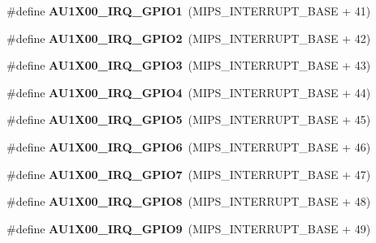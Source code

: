 \begin{DoxyCompactItemize}
\#define {\bfseries A\+U1\+X00\+\_\+\+I\+R\+Q\+\_\+\+G\+P\+I\+O1}~(M\+I\+P\+S\+\_\+\+I\+N\+T\+E\+R\+R\+U\+P\+T\+\_\+\+B\+A\+SE + 41)
\item 
\mbox{\label{group__bsp__interrupt_ga1203c8c40b46cea1be0cb1e045e48c7f}} 
\#define {\bfseries A\+U1\+X00\+\_\+\+I\+R\+Q\+\_\+\+G\+P\+I\+O2}~(M\+I\+P\+S\+\_\+\+I\+N\+T\+E\+R\+R\+U\+P\+T\+\_\+\+B\+A\+SE + 42)
\item 
\mbox{\label{group__bsp__interrupt_ga5fca3239b864790ea4bc6f1bbf966eea}} 
\#define {\bfseries A\+U1\+X00\+\_\+\+I\+R\+Q\+\_\+\+G\+P\+I\+O3}~(M\+I\+P\+S\+\_\+\+I\+N\+T\+E\+R\+R\+U\+P\+T\+\_\+\+B\+A\+SE + 43)
\item 
\mbox{\label{group__bsp__interrupt_gaf63059f170193b318ec094d32a73c7f2}} 
\#define {\bfseries A\+U1\+X00\+\_\+\+I\+R\+Q\+\_\+\+G\+P\+I\+O4}~(M\+I\+P\+S\+\_\+\+I\+N\+T\+E\+R\+R\+U\+P\+T\+\_\+\+B\+A\+SE + 44)
\item 
\mbox{\label{group__bsp__interrupt_gaa50f9d659d7dfab6bdd42286d95d2586}} 
\#define {\bfseries A\+U1\+X00\+\_\+\+I\+R\+Q\+\_\+\+G\+P\+I\+O5}~(M\+I\+P\+S\+\_\+\+I\+N\+T\+E\+R\+R\+U\+P\+T\+\_\+\+B\+A\+SE + 45)
\item 
\mbox{\label{group__bsp__interrupt_ga56630be037c2351fe5c351549c7570fe}} 
\#define {\bfseries A\+U1\+X00\+\_\+\+I\+R\+Q\+\_\+\+G\+P\+I\+O6}~(M\+I\+P\+S\+\_\+\+I\+N\+T\+E\+R\+R\+U\+P\+T\+\_\+\+B\+A\+SE + 46)
\item 
\mbox{\label{group__bsp__interrupt_ga399bb034b5d744b3f1455b1bcc1150b5}} 
\#define {\bfseries A\+U1\+X00\+\_\+\+I\+R\+Q\+\_\+\+G\+P\+I\+O7}~(M\+I\+P\+S\+\_\+\+I\+N\+T\+E\+R\+R\+U\+P\+T\+\_\+\+B\+A\+SE + 47)
\item 
\mbox{\label{group__bsp__interrupt_ga311b7e2014fa8b34cc03aa3206f706d9}} 
\#define {\bfseries A\+U1\+X00\+\_\+\+I\+R\+Q\+\_\+\+G\+P\+I\+O8}~(M\+I\+P\+S\+\_\+\+I\+N\+T\+E\+R\+R\+U\+P\+T\+\_\+\+B\+A\+SE + 48)
\item 
\mbox{\label{group__bsp__interrupt_ga8a7bfe18bdb251d38e8166bed830d3a5}} 
\#define {\bfseries A\+U1\+X00\+\_\+\+I\+R\+Q\+\_\+\+G\+P\+I\+O9}~(M\+I\+P\+S\+\_\+\+I\+N\+T\+E\+R\+R\+U\+P\+T\+\_\+\+B\+A\+SE + 49)

\end{DoxyCompactItemize}
